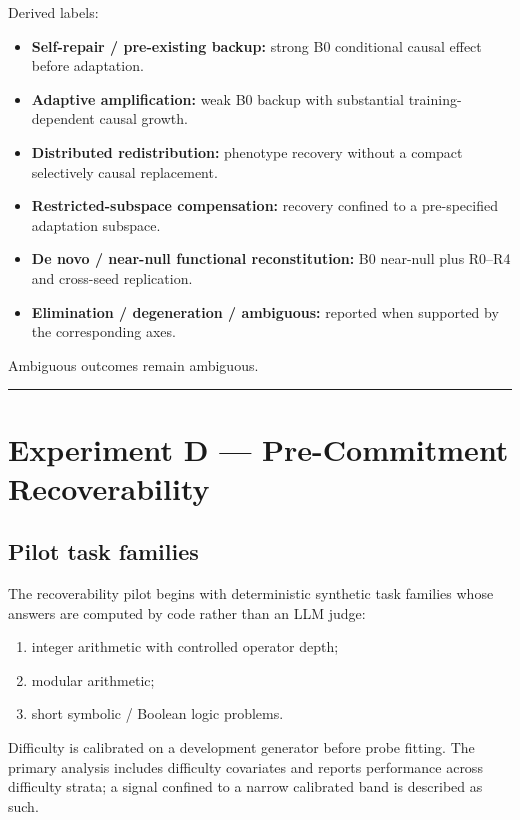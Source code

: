 Derived labels:

\begin{itemize}
\tightlist
\item \textbf{Self-repair / pre-existing backup:} strong B0 conditional causal effect before adaptation.
\item \textbf{Adaptive amplification:} weak B0 backup with substantial training-dependent causal growth.
\item \textbf{Distributed redistribution:} phenotype recovery without a compact selectively causal replacement.
\item \textbf{Restricted-subspace compensation:} recovery confined to a pre-specified adaptation subspace.
\item \textbf{De novo / near-null functional reconstitution:} B0 near-null plus R0--R4 and cross-seed replication.
\item \textbf{Elimination / degeneration / ambiguous:} reported when supported by the corresponding axes.
\end{itemize}

Ambiguous outcomes remain ambiguous.

\begin{center}\rule{0.5\linewidth}{0.5pt}\end{center}

\section{Experiment D --- Pre-Commitment Recoverability}\label{experiment-d-pre-commitment-recoverability}

\subsection{Pilot task families}\label{pilot-task-families}

The recoverability pilot begins with deterministic synthetic task families whose answers are computed by code rather than an LLM judge:

\begin{enumerate}
\tightlist
\item integer arithmetic with controlled operator depth;
\item modular arithmetic;
\item short symbolic / Boolean logic problems.
\end{enumerate}

Difficulty is calibrated on a development generator before probe fitting. The primary analysis includes difficulty covariates and reports performance across difficulty strata; a signal confined to a narrow calibrated band is described as such.

